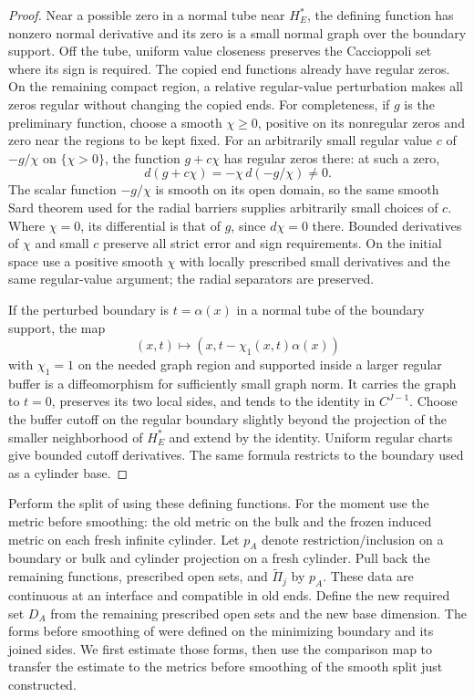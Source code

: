 \begin{proof}
Near a possible zero in a normal tube near $H_E^*$, the defining function has
nonzero normal derivative and its zero is a small normal graph over the
boundary support.  Off the tube, uniform value closeness preserves the Caccioppoli set
where its sign is required.  The copied end functions already have
regular zeros.  On the remaining compact region, a relative regular-value
perturbation makes all zeros regular without changing the copied ends.
For completeness, if $g$ is the preliminary function, choose a smooth
$\chi\ge0$, positive on its nonregular zeros and zero near the regions
to be kept fixed.  For an arbitrarily small regular value $c$ of
$-g/\chi$ on $\{\chi>0\}$, the function $g+c\chi$ has regular zeros
there: at such a zero,
\[
 d(g+c\chi)=-\chi\,d(-g/\chi)\ne0.
\]
The scalar function $-g/\chi$ is smooth on its open domain, so the
same smooth Sard theorem used for the radial barriers supplies
arbitrarily small choices of $c$. Where $\chi=0$, its differential is that of $g$, since
$d\chi=0$ there.  Bounded derivatives of $\chi$ and small $c$ preserve
all strict error and sign requirements.  On the initial space use a
positive smooth $\chi$ with locally prescribed small derivatives and
the same regular-value argument; the radial separators are preserved.

If the perturbed boundary is $t=\alpha(x)$ in a normal tube of the boundary support, the map
\[
 (x,t)\longmapsto (x,t-\chi_1(x,t)\alpha(x))
\]
with $\chi_1=1$ on the needed graph region and supported inside a larger
regular buffer is a diffeomorphism for sufficiently small graph norm.
It carries the graph to $t=0$, preserves its two local sides, and tends
to the identity in $C^{J-1}$.  Choose the buffer cutoff on the regular
boundary slightly beyond the projection of the smaller neighborhood of $H_E^*$
and extend by the identity.  Uniform regular charts give bounded
cutoff derivatives.  The same formula restricts to the boundary used as a
cylinder base.
\end{proof}

Perform the split of  using these defining functions.
For the moment use the metric before smoothing: the old metric on the bulk and the
frozen induced metric on each fresh infinite cylinder.  Let $p_A$ denote
restriction/inclusion on a boundary or bulk and cylinder projection on a
fresh cylinder.  Pull back the remaining functions, prescribed open sets, and
$\widetilde\Pi_j$ by $p_A$.  These data are continuous at an interface and
compatible in old ends.  Define the new required set $D_A$ from the
remaining prescribed open sets and the new base dimension.
The forms before smoothing of  were defined on the minimizing boundary and its joined sides.  We first estimate those forms,
then use the comparison map to transfer the estimate to the metrics before smoothing
of the smooth split just constructed.

